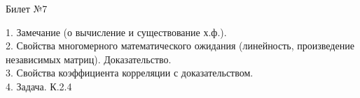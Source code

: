 \documentclass[preview]{standalone}
\begin{document}
 
\begin{center} {\Large Билет №7} \end{center} 

1.  Замечание (о вычисление и существование х.ф.).\\

2.  Свойства многомерного математического ожидания (линейность, произведение независимых матриц). Доказательство. \\

3.  Свойства коэффициента корреляции с доказательством.\\

4. Задача. К.2.4\\
\end{document}
